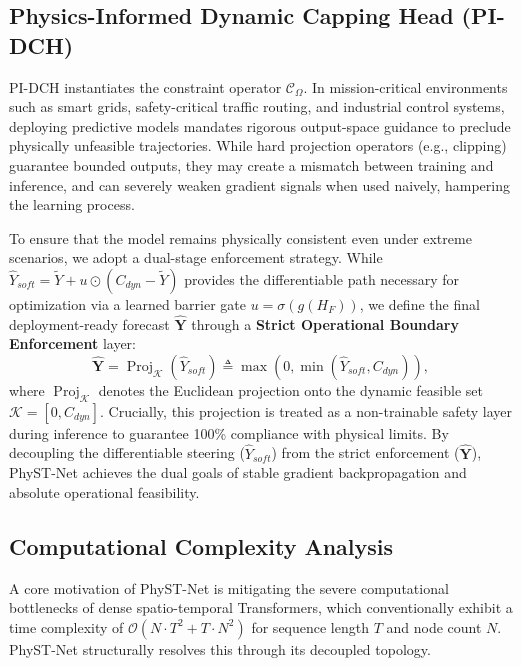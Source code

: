 \subsection{Physics-Informed Dynamic Capping Head (PI-DCH)}
\label{sec:pidch}
PI-DCH instantiates the constraint operator $\mathcal{C}_{\Omega}$. In mission-critical environments such as smart grids, safety-critical traffic routing, and industrial control systems, deploying predictive models mandates rigorous output-space guidance to preclude physically unfeasible trajectories. While hard projection operators (e.g., clipping) guarantee bounded outputs, they may create a mismatch between training and inference, and can severely weaken gradient signals when used naively, hampering the learning process.

To ensure that the model remains physically consistent even under extreme scenarios, we adopt a dual-stage enforcement strategy. While $\hat{Y}_{soft}=\tilde{Y}+u\odot(C_{dyn}-\tilde{Y})$ provides the differentiable path necessary for optimization via a learned barrier gate $u=\sigma(g(H_F))$, we define the final deployment-ready forecast $\hat{\mathbf{Y}}$ through a \textbf{Strict Operational Boundary Enforcement} layer:
\begin{equation}
\hat{\mathbf{Y}} = \operatorname{Proj}_{\mathcal{K}}(\hat{Y}_{soft}) \triangleq \max(0, \min(\hat{Y}_{soft}, C_{dyn})),
\label{eq:pidch_enforcement}
\end{equation}
where $\operatorname{Proj}_{\mathcal{K}}$ denotes the Euclidean projection onto the dynamic feasible set $\mathcal{K} = [0, C_{dyn}]$. Crucially, this projection is treated as a non-trainable safety layer during inference to guarantee 100\% compliance with physical limits. By decoupling the differentiable steering ($\hat{Y}_{soft}$) from the strict enforcement ($\hat{\mathbf{Y}}$), PhyST-Net achieves the dual goals of stable gradient backpropagation and absolute operational feasibility.

\subsection{Computational Complexity Analysis}
\label{sec:complexity_analysis}
A core motivation of PhyST-Net is mitigating the severe computational bottlenecks of dense spatio-temporal Transformers, which conventionally exhibit a time complexity of $\mathcal{O}(N \cdot T^2 + T \cdot N^2)$ for sequence length $T$ and node count $N$. PhyST-Net structurally resolves this through its decoupled topology.


